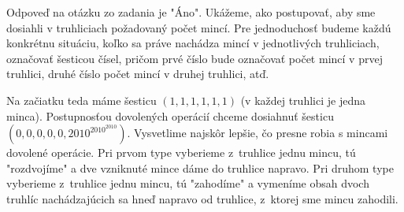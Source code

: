 {%
Odpoveď na otázku zo zadania je "Áno". Ukážeme, ako postupovať, aby sme dosiahli v truhliciach požadovaný počet mincí. Pre jednoduchosť budeme každú konkrétnu situáciu, koľko sa práve nachádza mincí v jednotlivých truhliciach, označovať šesticou čísel, pričom prvé číslo bude označovať počet mincí v prvej truhlici, druhé číslo počet mincí v druhej truhlici, atď.

Na začiatku teda máme šesticu $(1,1,1,1,1,1)$ (v každej truhlici je jedna minca). Postupnosťou dovolených operácií chceme dosiahnuť šesticu $(0,0,0,0,0,2010^{2010^{2010}})$. Vysvetlime najskôr lepšie, čo presne robia s mincami dovolené operácie. Pri prvom type vyberieme z~truhlice jednu mincu, tú "rozdvojíme" a dve vzniknuté mince dáme do truhlice napravo. Pri druhom type vyberieme z~truhlice jednu mincu, tú "zahodíme" a vymeníme obsah dvoch truhlíc nachádzajúcich sa hneď napravo od truhlice, z~ktorej sme mincu zahodili.

}
